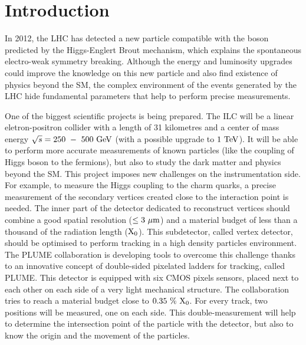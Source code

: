 \chapter{Introduction}

  In 2012, the \gls{LHC} has detected a new particle compatible with the boson predicted by the Higgs-Englert Brout mechanism, which explains the spontaneous electro-weak symmetry breaking.
  Although the energy and luminosity upgrades could improve the knowledge on this new particle and also find existence of physics beyond the \gls{SM}, the complex environment of the events generated by the \gls{LHC} hide fundamental parameters that help to perform precise measurements.

  One of the biggest scientific projects is being prepared. 
  The \gls{ILC} will be a linear eletron-positron collider with a length of 31 kilometres and a center of mass energy  $\sqrt{s} = 250~-~500~\rm{GeV}$ (with a possible upgrade to $1~\rm{TeV}$). 
  It will be able to perform more accurate measurements of known particles (like the coupling of Higgs boson to the fermions), but also to study the dark matter and physics beyond the \gls{SM}. 
  This project imposes new challenges on the instrumentation side. 
  For example, to measure the Higgs coupling to the charm quarks, a precise measurement of the secondary vertices created close to the interaction point is needed.
  The inner part of the detector dedicated to reconstruct vertices should combine a good spatial resolution ($\leq 3~\rm{\mu m}$) and a material budget of less than a thousand of the radiation length ($\rm{X_0}$).
  This subdetector, called vertex detector, should be optimised to perform tracking in a high density particles environment.
  The PLUME collaboration is developing tools to overcome this challenge thanks to an innovative concept of double-sided pixelated ladders for tracking, called \gls{PLUME}. 
  This detector is equipped with six CMOS pixels sensors, placed next to each other on each side of a very light mechanical structure. 
  The collaboration tries to reach a material budget close to $0.35~\%~\rm{X_0}$. 
  For every track, two positions will be measured, one on each side. 
  This double-measurement will help to determine the intersection point of the particle with the detector, but also to know the origin and the movement of the particles.

